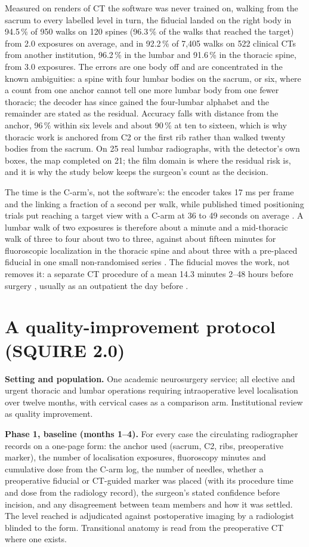 \documentclass[11pt,letterpaper]{article}
\begin{document}
Measured on renders of CT the software was never trained on, walking from the sacrum to every labelled
level in turn, the fiducial landed on the right body in 94.5\,\% of 950 walks on 120 spines (96.3\,\% of
the walks that reached the target) from 2.0 exposures on average, and in 92.2\,\% of 7,405 walks on 522
clinical CTs from another institution, 96.2\,\% in the lumbar and 91.6\,\% in the thoracic spine, from
3.0 exposures. The errors are one body off and are concentrated in the known ambiguities: a spine with
four lumbar bodies on the sacrum, or six, where a count from one anchor cannot tell one more lumbar body
from one fewer thoracic; the decoder has since gained the four-lumbar alphabet and the remainder are
stated as the residual. Accuracy falls with distance from the anchor, 96\,\% within six levels and about
90\,\% at ten to sixteen, which is why thoracic work is anchored from C2 or the first rib rather than
walked twenty bodies from the sacrum. On 25 real lumbar radiographs, with the detector's own boxes, the
map completed on 21; the film domain is where the residual risk is, and it is why the study below keeps
the surgeon's count as the decision.

The time is the C-arm's, not the software's: the encoder takes 17 ms per frame and the linking a fraction
of a second per walk, while published timed positioning trials put reaching a target view with a C-arm at 36
to 49 seconds on average \citep{matthews2007,desilva2018}. A lumbar walk of two exposures is therefore about a minute and a
mid-thoracic walk of three to four about two to three, against about fifteen minutes for fluoroscopic
localization in the thoracic spine and about three with a pre-placed fiducial in one small
non-randomised series \citep{mongardi2021}. The fiducial moves the work, not removes it: a separate CT
procedure of a mean 14.3 minutes 2--48 hours before surgery \citep{keil2024}, usually as an outpatient
the day before \citep{siminski2023}.

\section*{A quality-improvement protocol (SQUIRE 2.0)}
\noindent\textbf{Setting and population.} One academic neurosurgery service; all elective and urgent
thoracic and lumbar operations requiring intraoperative level localisation over twelve months, with
cervical cases as a comparison arm. Institutional review as quality improvement.

\noindent\textbf{Phase 1, baseline (months 1--4).} For every case the circulating radiographer records
on a one-page form: the anchor used (sacrum, C2, ribs, preoperative marker), the number of localisation
exposures, fluoroscopy minutes and cumulative dose from the C-arm log, the number of needles, whether a
preoperative fiducial or CT-guided marker was placed (with its procedure time and dose from the
radiology record), the surgeon's stated confidence before incision, and any disagreement between team
members and how it was settled. The level reached is adjudicated against postoperative imaging by a
radiologist blinded to the form. Transitional anatomy is read from the preoperative CT where one exists.
\end{document}
